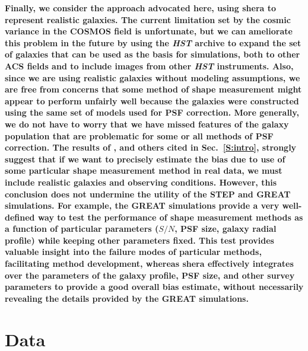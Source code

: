 \documentclass[twocolumn,useAMS,usenatbib]{mn2e}
\newcommand{\reftext}[1]{\textbf{#1}}
\begin{document}
\reftext{Finally, we consider the approach advocated here, using {\sc
    shera} to represent realistic galaxies.  The current limitation set by the
  cosmic variance in the COSMOS field is unfortunate, but we can
  ameliorate this problem in the future by using 
  the {\it HST} archive to expand the set of galaxies that can be used
  as the basis for simulations, both to other ACS fields and to
  include images from other {\it HST} instruments.  Also, since we are
  using realistic galaxies without modeling assumptions, we are free
  from concerns that some method of shape measurement might appear to
  perform unfairly well because the galaxies were constructed using
  the same set of models used for PSF correction.  More generally, we
  do not have to worry that we have missed features of the galaxy
  population that are problematic for some or all methods of PSF correction. The results of
  \cite{2010MNRAS.405.2044B}, and others cited in Sec.~\ref{S:intro}, 
  strongly suggest that if we want to precisely estimate the bias due to use of 
  some particular shape measurement method in real data, we must include
  realistic galaxies and observing conditions.  However,
this conclusion does not undermine the utility of the STEP and GREAT
simulations.  For example, the GREAT simulations provide a very
well-defined way to test the performance of shape measurement methods
as a function of particular parameters ($S/N$, PSF size,
galaxy radial profile) while keeping other parameters fixed. This test
provides valuable insight into the failure modes of particular
methods, facilitating method development, whereas {\sc shera}
effectively integrates over the parameters of the galaxy profile, PSF
size, and other survey parameters to provide a good overall bias
estimate, without necessarily revealing the details provided by the
GREAT simulations.}


\section{Data}\label{S:data}
\end{document}
